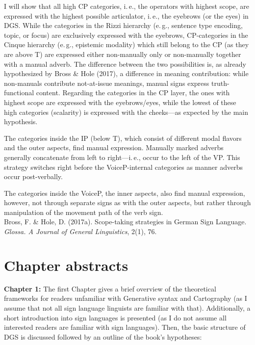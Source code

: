\documentclass[a4paper,DIV=calc,11pt]{scrartcl}
\begin{document}
I will show that all high CP categories, i.\,e., the operators with highest scope, are expressed with the highest possible articulator, i.\,e., the eyebrows (or the eyes) in DGS. While the categories in the Rizzi hierarchy (e.\,g., sentence type encoding, topic, or focus) are exclusively expressed with the eyebrows, CP-categories in the Cinque hierarchy (e.\,g., epistemic modality) which still belong to the CP (as they are above T) are expressed either non-manually only or non-manually together with a manual adverb. The difference between the two possibilities is, as already hypothesized by Bross \& Hole (2017), a difference in meaning contribution: while non-manuals contribute not-at-issue meanings, manual signs express truth-functional content. Regarding the categories in the CP layer, the ones with highest scope are expressed with the eyebrows/eyes, while the lowest of these high categories (scalarity) is expressed with the cheeks---as expected by the main hypothesis. 

The categories inside the IP (below T), which consist of different modal flavors and the outer aspects, find manual expression. Manually marked adverbs generally concatenate from left to right---i.\,e., occur to the left of the VP. This strategy switches right before the VoiceP-internal categories as manner adverbs occur post-verbally. 

The categories inside the VoiceP, the inner aspects, also find manual expression, however, not through separate signs as with the outer aspects, but rather through manipulation of the movement path of the verb sign.\\


\noindent Bross, F. \& Hole, D. (2017a). Scope-taking strategies in German Sign Language. \textit{Glossa. A Journal of General Linguistics}, 2(1), 76.

\clearpage
\section*{Chapter abstracts}
\noindent \textbf{Chapter 1:} The first Chapter gives a brief overview of the theoretical frameworks for readers unfamiliar with Generative syntax and Cartography (as I assume that not all sign language linguists are familiar with that). Additionally, a short introduction into sign languages is presented (as I do not assume all interested readers are familiar with sign languages). Then, the basic structure of DGS is discussed followed by an outline of the book's hypotheses:
\end{document}
